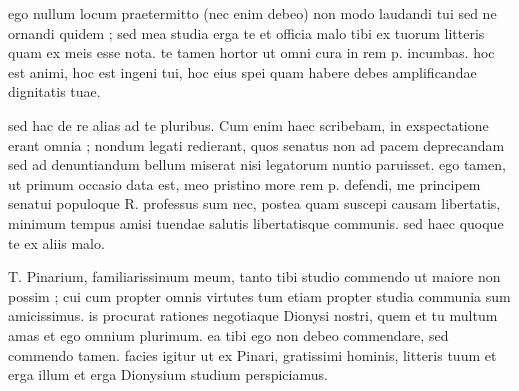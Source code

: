 


 ego nullum locum praetermitto (nec enim debeo) non modo laudandi tui sed ne ornandi quidem ; sed mea studia erga te et officia malo tibi ex tuorum litteris quam ex meis esse nota. te tamen hortor ut omni cura in rem p. incumbas. hoc est animi, hoc est ingeni tui, hoc eius spei quam habere debes amplificandae dignitatis tuae.

 sed hac de re alias ad te pluribus. Cum enim haec scribebam, in exspectatione erant omnia ; nondum legati redierant, quos senatus non ad pacem deprecandam sed ad denuntiandum bellum miserat nisi legatorum nuntio paruisset. ego tamen, ut primum occasio data est, meo pristino more rem p. defendi, me principem senatui populoque R. professus sum nec, postea quam suscepi causam libertatis, minimum tempus amisi tuendae salutis libertatisque communis. sed haec quoque te ex aliis malo.

 T. Pinarium, familiarissimum meum, tanto tibi studio commendo ut maiore non possim ; cui cum propter omnis virtutes tum etiam propter studia communia sum amicissimus. is procurat rationes negotiaque Dionysi nostri, quem et tu multum amas et ego omnium plurimum. ea tibi ego non debeo commendare, sed commendo tamen. facies igitur ut ex Pinari, gratissimi hominis, litteris tuum et erga illum et erga Dionysium studium perspiciamus.
